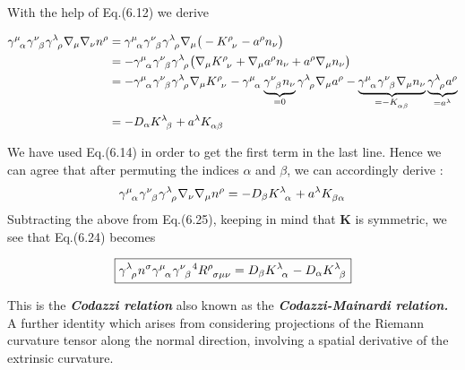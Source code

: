 \documentclass[12pt]{article}
\renewcommand{\vec}[1]{\bm{#1}}
\numberwithin{equation}{section}
\numberwithin{theorem}{subsection}
\begin{document}
With the help of Eq.(6.12) we derive

\begin{align}

  \tensor{\gamma}{^\mu_\alpha}\tensor{\gamma}{^\nu_\beta}\tensor{\gamma}{^\lambda_\rho}\nabla_{\mu}\nabla_{\nu}n^{\rho} &= \tensor{\gamma}{^\mu_\alpha}\tensor{\gamma}{^\nu_\beta}\tensor{\gamma}{^\lambda_\rho}\nabla_{\mu}\big(-\tensor{K}{^\rho_\nu} - a^{\rho}n_{\nu} \big) \notag \\

  &= - \tensor{\gamma}{^\mu_\alpha}\tensor{\gamma}{^\nu_\beta}\tensor{\gamma}{^\lambda_\rho} \big(\nabla_{\mu}\tensor{K}{^\rho_\nu} + \nabla_{\mu}a^{\rho}n_{\nu}+a^{\rho}\nabla_{\mu}n_{\nu} \big) \notag\\

  &= -\tensor{\gamma}{^\mu_\alpha}\tensor{\gamma}{^\nu_\beta}\tensor{\gamma}{^\lambda_\rho}\nabla_{\mu}\tensor{K}{^\rho_\nu} -\tensor{\gamma}{^\mu_\alpha}\underbrace{\tensor{\gamma}{^\nu_\beta}n_{\nu}}_{= 0}\tensor{\gamma}{^\lambda_\rho}\nabla_{\mu}a^{\rho} - \underbrace{\tensor{\gamma}{^\mu_\alpha}\tensor{\gamma}{^\nu_\beta}\nabla_{\mu}n_{\nu}}_{= -\tensor{K}{_\alpha_\beta}}\underbrace{\tensor{\gamma}{^\lambda_\rho}a^{\rho}}_{= a^{\lambda}} \notag \\ 

  &= -D_{\alpha}\tensor{K}{^\lambda_\beta} + a^{\lambda}\tensor{K}{_\alpha_\beta}

\end{align}

We have used Eq.(6.14) in order to get the first term in the last line. Hence we can agree that after permuting the indices $\alpha$ and $\beta$, we can accordingly derive :$$\tensor{\gamma}{^\mu_\alpha}\tensor{\gamma}{^\nu_\beta}\tensor{\gamma}{^\lambda_\rho}\nabla_{\nu}\nabla_{\mu}n^{\rho} = -D_{\beta}\tensor{K}{^\lambda_\alpha}+a^{\lambda}\tensor{K}{_\beta_\alpha}$$ Subtracting the above from Eq.(6.25), keeping in mind that $\vec{K}$ is symmetric, we see that Eq.(6.24) becomes

\begin{equation}

    \boxed{\tensor{\gamma}{^\lambda_\rho}n^{\sigma}\tensor{\gamma}{^\mu_\alpha}\tensor{\gamma}{^\nu_\beta}^{4}\tensor{R}{^\rho_\sigma_\mu_\nu} = D_{\beta}\tensor{K}{^\lambda_\alpha}-D_{\alpha}\tensor{K}{^\lambda_\beta}}

\end{equation}

This is the \textbf{\textit{Codazzi relation}} also known as the \textbf{\textit{Codazzi-Mainardi relation.}} \newline A further identity which arises from considering projections of the Riemann curvature tensor along the normal direction, involving a spatial derivative of the extrinsic curvature.
\end{document}
